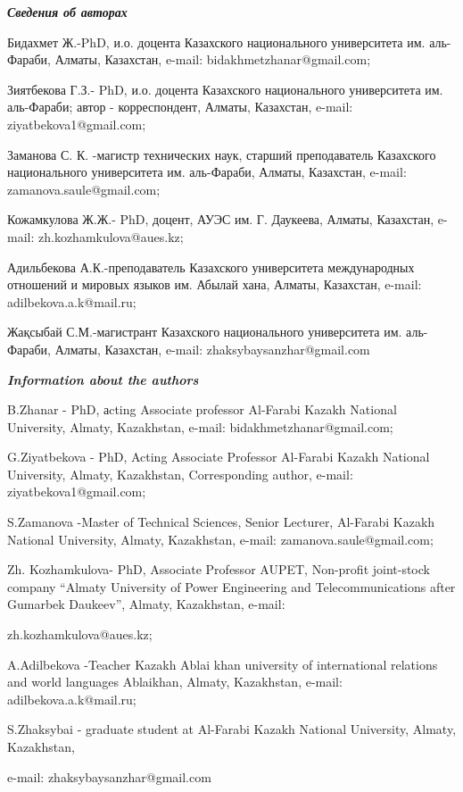 \emph{{\bfseries Сведения об авторах}}

\begin{noparindent}
Бидахмет Ж.-PhD, и.о. доцента Казахского национального университета им.
аль-Фараби, Алматы, Казахстан, e-mail: bidakhmetzhanar@gmail.com;

Зиятбекова Г.З.- PhD, и.о. доцента Казахского национального университета
им. аль-Фараби; автор - корреспондент, Алматы, Казахстан, e-mail:
ziyatbekova1@gmail.com;

Заманова С. К. -магистр технических наук, старший преподаватель
Казахского национального университета им. аль-Фараби, Алматы, Казахстан,
e-mail: zamanova.saule@gmail.com;

Кожамкулова Ж.Ж.- PhD, доцент, АУЭС им. Г. Даукеева, Алматы, Казахстан,
e-mail: zh.kozhamkulova@aues.kz;

Адильбекова А.К.-преподаватель Казахского университета международных
отношений и мировых языков им. Абылай хана, Алматы, Казахстан, e-mail:
adilbekova.a.k@mail.ru;

Жақсыбай С.М.-магистрант Казахского национального университета им.
аль-Фараби, Алматы, Казахстан, e-mail: zhaksybaysanzhar@gmail.com
\end{noparindent}

\emph{{\bfseries Information about the authors}}

\begin{noparindent}
B.Zhanar - PhD, аcting Associate professor Al-Farabi Kazakh National
University, Almaty, Kazakhstan, e-mail: bidakhmetzhanar@gmail.com;

G.Ziyatbekova - PhD, Acting Associate Professor Al-Farabi Kazakh
National University, Almaty, Kazakhstan, Corresponding author, e-mail:
ziyatbekova1@gmail.com;

S.Zamanova -Master of Technical Sciences, Senior Lecturer, Al-Farabi
Kazakh National University, Almaty, Kazakhstan, e-mail:
zamanova.saule@gmail.com;

Zh. Kozhamkulova- PhD, Associate Professor AUPET, Non-profit joint-stock
company ``Almaty University of Power Engineering and Telecommunications
after Gumarbek Daukeev'', Almaty, Kazakhstan, e-mail:

zh.kozhamkulova@aues.kz;

A.Adilbekova -Teacher Kazakh Ablai khan university of international
relations and world languages Ablaikhan, Almaty, Kazakhstan, e-mail:
adilbekova.a.k@mail.ru;

S.Zhaksybai - graduate student at Al-Farabi Kazakh National University,
Almaty, Kazakhstan,

e-mail: zhaksybaysanzhar@gmail.com
\end{noparindent}
